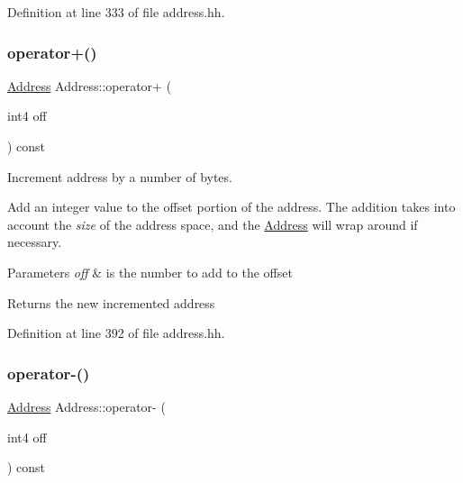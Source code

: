 Definition at line 333 of file address.\+hh.

\mbox{\label{class_address_a2e0f4cfc80a3284beeb1fa70adcfa9cb}} 
\subsubsection{\texorpdfstring{operator+()}{operator+()}}
{\footnotesize\ttfamily \mbox{\hyperlink{class_address}{Address}} Address\+::operator+ (\begin{DoxyParamCaption}\item[{int4}]{off }\end{DoxyParamCaption}) const\hspace{0.3cm}{\ttfamily [inline]}}



Increment address by a number of bytes. 

Add an integer value to the offset portion of the address. The addition takes into account the {\itshape size} of the address space, and the \mbox{\hyperlink{class_address}{Address}} will wrap around if necessary. 
\begin{DoxyParams}{Parameters}
{\em off} & is the number to add to the offset \\
\hline
\end{DoxyParams}
\begin{DoxyReturn}{Returns}
the new incremented address 
\end{DoxyReturn}


Definition at line 392 of file address.\+hh.

\mbox{\label{class_address_adbf6ed048012cc8d1f52e1d4fd63b7aa}} 
\subsubsection{\texorpdfstring{operator-\/()}{operator-()}}
{\footnotesize\ttfamily \mbox{\hyperlink{class_address}{Address}} Address\+::operator-\/ (\begin{DoxyParamCaption}\item[{int4}]{off }\end{DoxyParamCaption}) const\hspace{0.3cm}{\ttfamily [inline]}}



